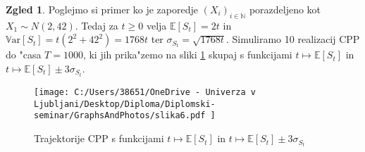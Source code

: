 \documentclass[12pt, a4paper, reqno]{amsart}
\theoremstyle{definition}
\newtheorem{zgled}[definicija]{Zgled}
\theoremstyle{plain}
\newcommand{\R}{\mathbb{R}}
\newcommand{\N}{\mathbb{N}}
\newcommand{\E}{\mathbb{E}}
\newcommand{\Prob}{\mathbb{P}}
\newcommand{\1}{\mathds{1}}
\newcommand{\Var}[1]{\text{$\mathbb{V}\!\mathrm{ar}$}\left[#1\right]}
\begin{document}
    \begin{zgled}
        Poglejmo si primer ko je zaporedje $(X_i)_{i\in\N}$ porazdeljeno kot $X_1\sim N(2, 42)$. 
        Tedaj za $t\geq 0 $ velja $\E\left[S_t\right] = 2t$ in 
        $\Var{S_t} = t(2^2 + 42^2) = 1768t$ ter $\sigma_{S_t} = \sqrt{1768t}$. Simuliramo 10 realizacij CPP do "casa $T=1000$, 
        ki jih prika"zemo na sliki \ref{fig:slika6} skupaj s funkcijami $t \mapsto \E\left[S_t\right]$ in $t \mapsto \E\left[S_t\right] \pm 3\sigma_{S_t}$. 
        \begin{figure}[H]
            \centering
            \texttt{[image: 
                C:/Users/38651/OneDrive - Univerza v Ljubljani/Desktop/Diploma/Diplomski-seminar/GraphsAndPhotos/slika6.pdf
                ]}
            \caption{Trajektorije CPP s funkcijami $t \mapsto \E\left[S_t\right]$ in $t \mapsto \E\left[S_t\right] \pm 3\sigma_{S_t}$}
            \label{fig:slika6}
        \end{figure}

    \end{zgled}
    
%
%
%
%
%
%
%
%
\end{document}
